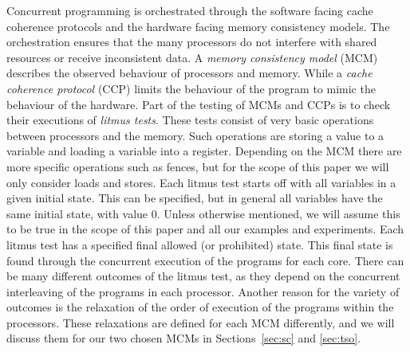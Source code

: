 \documentclass[runningheads]{llncs}
\begin{document}
Concurrent programming is orchestrated through the software facing cache coherence protocols and the hardware facing memory consistency models.
The orchestration ensures that the many processors do not interfere with shared resources or receive inconsistent data.
A \emph{memory consistency model} (MCM) describes the observed behaviour of processors and memory.
While a \emph{cache coherence protocol} (CCP) limits the behaviour of the program to mimic the behaviour of the hardware.
Part of the testing of MCMs and CCPs is to check their executions of \emph{litmus tests}.
These tests consist of very basic operations between processors and the memory.
Such operations are storing a value to a variable and loading a variable into a register.
Depending on the MCM there are more specific operations such as fences, but for the scope of this paper we will only consider loads and stores.
Each litmus test starts off with all variables in a given initial state.
This can be specified, but in general all variables have the same initial state, with value 0.
Unless otherwise mentioned, we will assume this to be true in the scope of this paper and all our examples and experiments.
Each litmus test has a specified final allowed (or prohibited) state.
This final state is found through the concurrent execution of the programs for each core.
There can be many different outcomes of the litmus test, as they depend on the concurrent interleaving of the programs in each processor.
Another reason for the variety of outcomes is the relaxation of the order of execution of the programs within the processors.
These relaxations are defined for each MCM differently, and we will discuss them for our two chosen MCMs in Sections~\ref{sec:sc} and \ref{sec:tso}.
\end{document}

